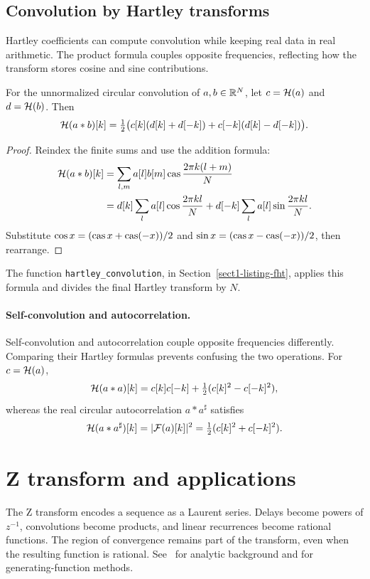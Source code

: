 \subsection{Convolution by Hartley transforms}
\label{sect2-usage-hartley-convolution}

Hartley coefficients can compute convolution while keeping real data in real
arithmetic. The product formula couples opposite frequencies, reflecting how
the transform stores cosine and sine contributions.

\begin{prop}
For the unnormalized circular convolution of $a,b\in\mathbb{R}^N$, let
$c=\mathcal{H}(a)$ and $d=\mathcal{H}(b)$. Then
\[
 \mathcal{H}(a*b)[k]=\tfrac12\bigl(c[k](d[k]+d[-k])
                         +c[-k](d[k]-d[-k])\bigr).
\]
\end{prop}
\begin{proof}
Reindex the finite sums and use the addition formula:
\begin{align*}
 \mathcal{H}(a*b)[k]
 &=\sum_{l,m}a[l]b[m]\operatorname{cas}\frac{2\pi k(l+m)}{N}\\
 &=d[k]\sum_l a[l]\cos\frac{2\pi kl}{N}
   +d[-k]\sum_l a[l]\sin\frac{2\pi kl}{N}.
\end{align*}
Substitute $\cos x=(\operatorname{cas} x+\operatorname{cas}(-x))/2$ and
$\sin x=(\operatorname{cas} x-\operatorname{cas}(-x))/2$, then rearrange.
\end{proof}
The function \texttt{hartley\_convolution}, in
Section~\ref{sect1-listing-fht}, applies this formula and divides the
final Hartley transform by $N$.

\paragraph{Self-convolution and autocorrelation.}
Self-convolution and autocorrelation couple opposite frequencies
differently. Comparing their Hartley formulas prevents confusing
the two operations. For $c=\mathcal{H}(a)$,
\[
 \mathcal{H}(a*a)[k]=c[k]c[-k]+\tfrac12(c[k]^2-c[-k]^2),
\]
whereas the real circular autocorrelation $a*a^\sharp$ satisfies
\[
 \mathcal{H}(a*a^\sharp)[k]=|\mathcal{F}(a)[k]|^2
                 =\tfrac12(c[k]^2+c[-k]^2).
\]

\section{Z transform and applications}
\label{sect1-trans-Z}
The Z transform encodes a sequence as a Laurent series. Delays become
powers of $z^{-1}$, convolutions become products, and linear recurrences
become rational functions. The region of convergence remains part of the
transform, even when the resulting function is rational.
See~\cite{wich,demengel,cartan-holo} for analytic background and
\cite{knuth-concrete,generatingfunctionology} for generating-function methods.

